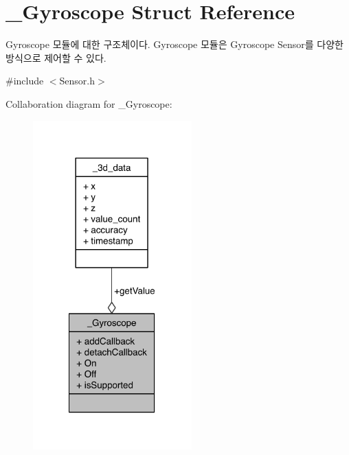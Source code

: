 \hypertarget{struct__Gyroscope}{\section{\-\_\-\-Gyroscope Struct Reference}
\label{struct__Gyroscope}
}


Gyroscope 모듈에 대한 구조체이다. Gyroscope 모듈은 Gyroscope Sensor를 다양한 방식으로 제어할 수 있다.  




{\ttfamily \#include $<$Sensor.\-h$>$}



Collaboration diagram for \-\_\-\-Gyroscope\-:\nopagebreak
\begin{figure}[H]
\begin{center}
\leavevmode
\includegraphics[width=173pt]{d8/d92/struct__Gyroscope__coll__graph}
\end{center}
\end{figure}

